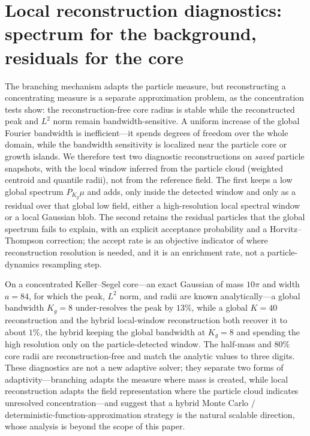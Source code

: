 \documentclass[a4paper,fleqn]{cas-sc}
\theoremstyle{definition}
\theoremstyle{remark}
\begin{document}
\section{Local reconstruction diagnostics: spectrum for the background, residuals for the core}
\label{sec:hybrid_recon}

The branching mechanism adapts the particle measure, but reconstructing a concentrating measure is a separate approximation problem, as the concentration tests show: the reconstruction-free core radius is stable while the reconstructed peak and $L^2$ norm remain bandwidth-sensitive.  A uniform increase of the global Fourier bandwidth is inefficient---it spends degrees of freedom over the whole domain, while the bandwidth sensitivity is localized near the particle core or growth islands.  We therefore test two diagnostic reconstructions on \emph{saved} particle snapshots, with the local window inferred from the particle cloud (weighted centroid and quantile radii), not from the reference field.  The first keeps a low global spectrum $P_{K_g}\mu$ and adds, only inside the detected window and only as a residual over that global low field, either a high-resolution local spectral window or a local Gaussian blob.  The second retains the residual particles that the global spectrum fails to explain, with an explicit acceptance probability and a Horvitz--Thompson correction; the accept rate is an objective indicator of where reconstruction resolution is needed, and it is an enrichment rate, not a particle-dynamics resampling step.

On a concentrated Keller--Segel core---an exact Gaussian of mass $10\pi$ and width $a=84$, for which the peak, $L^2$ norm, and radii are known analytically---a global bandwidth $K_g=8$ under-resolves the peak by $13\%$, while a global $K=40$ reconstruction and the hybrid local-window reconstruction both recover it to about $1\%$, the hybrid keeping the global bandwidth at $K_g=8$ and spending the high resolution only on the particle-detected window.  The half-mass and $80\%$ core radii are reconstruction-free and match the analytic values to three digits.  These diagnostics are not a new adaptive solver; they separate two forms of adaptivity---branching adapts the measure where mass is created, while local reconstruction adapts the field representation where the particle cloud indicates unresolved concentration---and suggest that a hybrid Monte Carlo / deterministic-function-approximation strategy is the natural scalable direction, whose analysis is beyond the scope of this paper.
\end{document}
